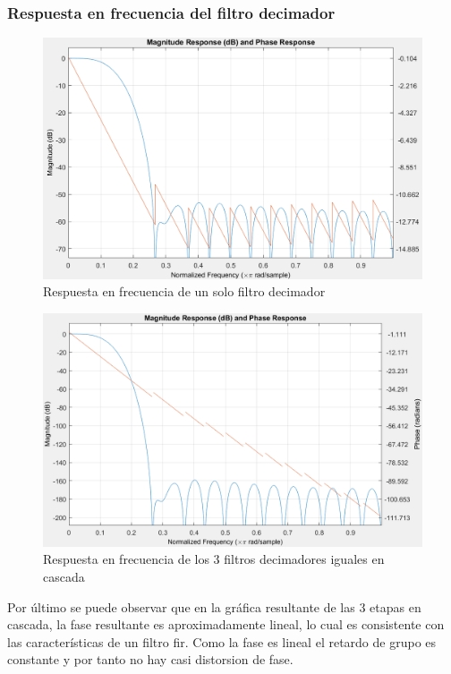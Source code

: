 \documentclass[assd_tp3_main.tex]{subfiles}
\begin{document}
\subsubsection{Respuesta en frecuencia del filtro decimador}
\begin{figure}[H]
\centering
\includegraphics[width=0.8\linewidth]{images/ej4/Decimation_1filt.png}
\caption{Respuesta en frecuencia de un solo filtro decimador}
\label{fig:Decimation_1filt}
\end{figure}

\begin{figure}[H]
\centering
\includegraphics[width=0.8\linewidth]{images/ej4/Decimation_3filt_cascade.png}
\caption{Respuesta en frecuencia de los 3 filtros decimadores iguales en cascada}
\label{fig:Decimation_3filt_cascade}
\end{figure}
Por último se puede observar que en la gráfica resultante de las 3 etapas en cascada, la fase resultante es aproximadamente lineal, lo cual es consistente con las características de un filtro fir. Como la fase es lineal el retardo de grupo es constante y por tanto no hay casi distorsion de fase.
\end{document}
